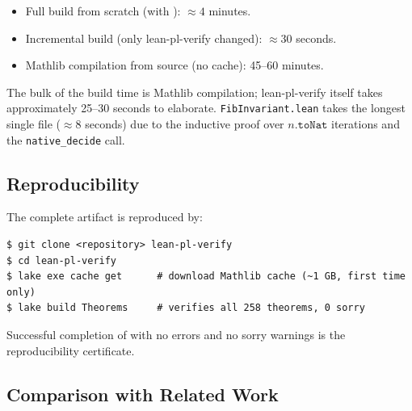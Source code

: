 \begin{itemize}[leftmargin=2em]
  \item Full build from scratch (with ): $\approx 4$ minutes.
  \item Incremental build (only lean-pl-verify changed): $\approx 30$ seconds.
  \item Mathlib compilation from source (no cache): 45--60 minutes.
\end{itemize}

The bulk of the build time is Mathlib compilation; lean-pl-verify itself
takes approximately 25--30 seconds to elaborate. \texttt{FibInvariant.lean}
takes the longest single file ($\approx 8$ seconds) due to the inductive
proof over $n.\texttt{toNat}$ iterations and the \texttt{native\_decide} call.

\subsection{Reproducibility}

The complete artifact is reproduced by:

\begin{lstlisting}[language={},caption={Reproduction commands.},label={lst:repro}]
$ git clone <repository> lean-pl-verify
$ cd lean-pl-verify
$ lake exe cache get      # download Mathlib cache (~1 GB, first time only)
$ lake build Theorems     # verifies all 258 theorems, 0 sorry
\end{lstlisting}

Successful completion of  with no errors and no
sorry warnings is the reproducibility certificate.

\subsection{Comparison with Related Work}

